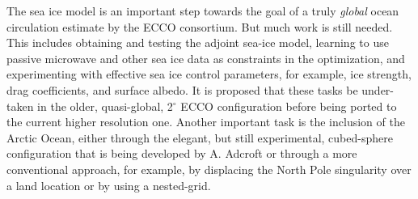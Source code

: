 The sea ice model is an important step towards the goal of a truly {\em
global} ocean circulation estimate by the ECCO consortium.  But much work is
still needed.  This includes obtaining and testing the adjoint sea-ice model,
learning to use passive microwave and other sea ice data as constraints in the
optimization, and experimenting with effective sea ice control parameters, for
example, ice strength, drag coefficients, and surface albedo.  It is proposed
that these tasks be under-
\noindent taken in the older, quasi-global, 2$^\circ$ ECCO configuration
before being ported to the current higher resolution one.  Another important
task is the inclusion of the Arctic Ocean, either through the elegant, but
still experimental, cubed-sphere configuration that is being developed by
A. Adcroft or through a more conventional approach, for example, by displacing
the North Pole singularity over a land location or by using a nested-grid.
